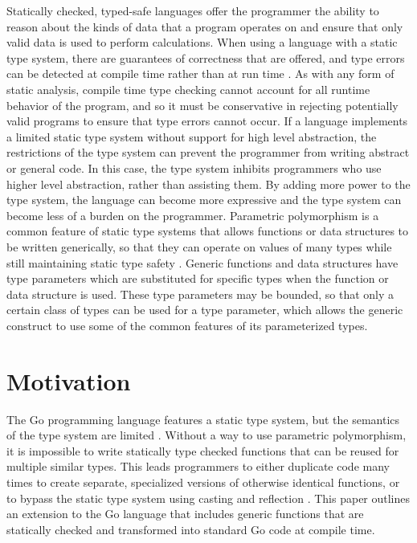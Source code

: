 \documentclass[letterpaper,twocolumn,11pt]{article}
\begin{document}
Statically checked, typed-safe languages offer the programmer the ability to reason about the kinds of data that a program operates on and ensure that only valid data is used to perform calculations. When using a language with a static type system, there are guarantees of correctness that are offered, and type errors can be detected at compile time rather than at run time \cite{milner1978theory}. As with any form of static analysis, compile time type checking cannot account for all runtime behavior of the program, and so it must be conservative in rejecting potentially valid programs to ensure that type errors cannot occur. If a language implements a limited static type system without support for high level abstraction, the restrictions of the type system can prevent the programmer from writing abstract or general code. In this case, the type system inhibits programmers who use higher level abstraction, rather than assisting them. By adding more power to the type system, the language can become more expressive and the type system can become less of a burden on the programmer. Parametric polymorphism is a common feature of static type systems that allows functions or data structures to be written generically, so that they can operate on values of many types while still maintaining static type safety \cite{cardelli1987basic}. Generic functions and data structures have type parameters which are substituted for specific types when the function or data structure is used. These type parameters may be bounded, so that only a certain class of types can be used for a type parameter, which allows the generic construct to use some of the common features of its parameterized types.

\section{Motivation} \label{motivation}

The Go programming language features a static type system, but the semantics of the type system are limited \cite{gospec}. Without a way to use parametric polymorphism, it is impossible to write statically type checked functions that can be reused for multiple similar types. This leads programmers to either duplicate code many times to create separate, specialized versions of otherwise identical functions, or to bypass the static type system using casting and reflection \cite{gofaq}.  This paper outlines an extension to the Go language that includes generic functions that are statically checked and transformed into standard Go code at compile time.
\end{document}
